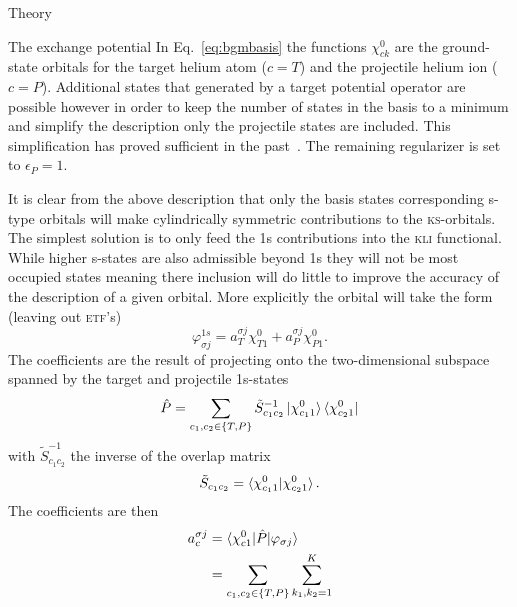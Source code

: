 \documentclass[aps, pra, reprint, groupedaddress, amsfonts,
               amsmath, amssymb, showpacs, nofootinbib]{revtex4-1}
\begin{document}
\begin{section}{Theory \label{sec:theory}}
\begin{subsection}{The exchange potential \label{sec:xpot}}
      In Eq.~\eqref{eq:bgmbasis} the functions $\chi^{0}_{ck}$ are the ground-state orbitals for the
      target helium atom ($c = T$) and the projectile helium ion ($c = P$). Additional states that
      generated by a target potential operator are possible however in order to keep the number
      of states in the basis to a minimum and simplify the description only the projectile states are
      included. This simplification has proved sufficient in the past~\cite{bgm-rev}. The remaining
      regularizer is set to $\epsilon_P = 1$.

      It is clear from the above description that only the basis states corresponding s-type orbitals
      will make cylindrically symmetric contributions to the \textsc{ks}-orbitals. The simplest solution
      is to only feed the 1s contributions into the \textsc{kli} functional. While higher s-states are
      also admissible beyond 1s they will not be most occupied states meaning there inclusion will do
      little to improve the accuracy of the description of a given orbital. More explicitly the orbital
      will take the form (leaving out \textsc{etf}'s)
      \begin{equation} \label{eq:1sonly}
         \varphi_{\sigma j}^{1s} = a^{\sigma j}_T \chi^{0}_{T1} + a^{\sigma j}_P \chi^{0}_{P1}.
      \end{equation}
      The coefficients are the result of projecting onto the two-dimensional subspace spanned by the
      target and projectile 1s-states
      \begin{equation} \label{eq:proj}
         \hat{P} = \sum\limits_{c_1, c_2 \in \{T,P\}} \tilde{S}^{-1}_{c_1 c_2}
                                                      \ket{\chi^{0}_{c_1 1}}
                                                      \bra{\chi^{0}_{c_2 1}}
      \end{equation}
      with $\tilde{S}^{-1}_{c_1 c_2}$ the inverse of the overlap matrix
      \begin{equation} \label{eq:overlap2d}
         \tilde{S}_{c_1 c_2} = \braket{ \chi^{0}_{c_1 1} | \chi^{0}_{c_2 1} }.
      \end{equation}
      The coefficients are then
      \begin{equation} \label{eq:coef}
         \begin{split}
            a^{\sigma j}_c & = \braket{ \chi^{0}_{c 1} | \hat{P} | \varphi_{\sigma j} } \\
                           & = \sum\limits_{c_1, c_2 \in \{T,P\}} \sum\limits_{k_1, k_2 = 1}^K

\end{split}
\end{equation}
\end{subsection}
\end{section}
\end{document}

